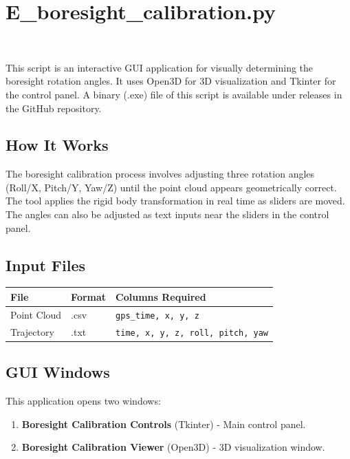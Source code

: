 \chapter{E\_boresight\_calibration.py}\
\label{ch:scriptE}

This script is an interactive GUI application for visually determining the boresight rotation angles. It uses Open3D for 3D visualization and Tkinter for the control panel. A binary (.exe) file of this script is available under releases in the GitHub repository.

\section{How It Works}
The boresight calibration process involves adjusting three rotation angles (Roll/X, Pitch/Y, Yaw/Z) until the point cloud appears geometrically correct. The tool applies the rigid body transformation in real time as sliders are moved. The angles can also be adjusted as text inputs near the sliders in the control panel.

\section{Input Files}
\begin{table}[!ht]
    \centering
    \begin{tabularx}{\textwidth}{llX}
        \toprule
        File        & Format & Columns Required                         \\ \midrule
        Point Cloud & .csv   & \texttt{gps\_time, x, y, z}              \\
        Trajectory  & .txt   & \texttt{time, x, y, z, roll, pitch, yaw} \\ \bottomrule
    \end{tabularx}
\end{table}

\section{GUI Windows}

This application opens two windows:
\begin{enumerate}
    \item \textbf{Boresight Calibration Controls} (Tkinter) - Main control panel.
    \item \textbf{Boresight Calibration Viewer} (Open3D) - 3D visualization window.
\end{enumerate}


